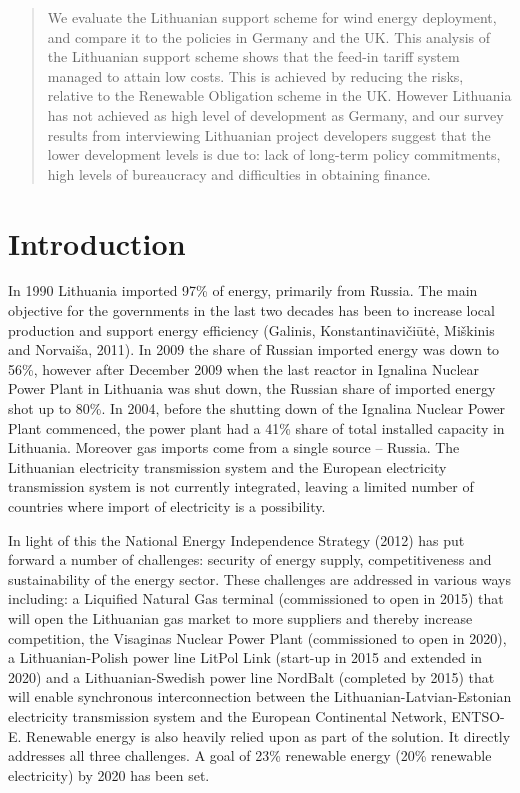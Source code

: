 \documentclass[a4paper, 12pt]{article}
\begin{document}

\begin{abstract}
We evaluate the Lithuanian support scheme for wind energy deployment, and compare it to the policies in Germany and the UK. This analysis of the Lithuanian support scheme shows that the feed-in tariff system managed to attain low costs. This is achieved by reducing the risks, relative to the Renewable Obligation scheme in the UK. However Lithuania has not achieved as high level of development as Germany, and our survey results from interviewing Lithuanian project developers suggest that the lower development levels is due to: lack of long-term policy commitments, high levels of bureaucracy and difficulties in obtaining finance.
\end{abstract}

\newpage

\tableofcontents

\newpage

\section{Introduction}

In 1990 Lithuania imported 97\% of energy, primarily from Russia. The main objective for the governments in the last two decades has been to increase local production and support energy efficiency (Galinis, Konstantinavičiūtė, Miškinis and Norvaiša, 2011). In 2009 the share of Russian imported energy was down to 56\%, however after December 2009 when the last reactor in Ignalina Nuclear Power Plant in Lithuania was shut down, the Russian share of imported energy shot up to 80\%. In 2004, before the shutting down of the Ignalina Nuclear Power Plant commenced, the power plant had a 41\% share of total installed capacity in Lithuania. Moreover gas imports come from a single source – Russia. The Lithuanian electricity transmission system and the European electricity transmission system is not currently integrated, leaving a limited number of countries where import of electricity is a possibility.

In light of this the National Energy Independence Strategy (2012) has put forward a number of challenges: security of energy supply, competitiveness and sustainability of the energy sector. These challenges are addressed in various ways including: a Liquified Natural Gas terminal (commissioned to open in 2015) that will open the Lithuanian gas market to more suppliers and thereby increase competition, the Visaginas Nuclear Power Plant (commissioned to open in 2020), a Lithuanian-Polish power line LitPol Link (start-up in 2015 and extended in 2020) and a Lithuanian-Swedish power line NordBalt (completed by 2015) that will enable synchronous interconnection between the Lithuanian-Latvian-Estonian electricity transmission system and the European Continental Network, ENTSO-E. Renewable energy is also heavily relied upon as part of the solution. It directly addresses all three challenges. A goal of 23\% renewable energy (20\% renewable electricity) by 2020 has been set.
\end{document}
